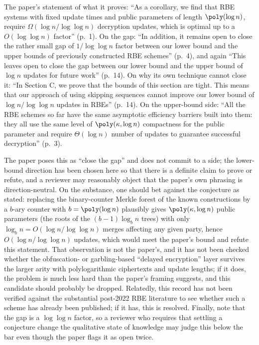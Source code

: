 \documentclass{conjura-conjecture}
\begin{document}
\begin{remark}[Openness]\label{rem:open}
The paper's statement of what it proves: ``As a corollary, we find that
RBE systems with fixed update times and public parameters of length
$\poly(\log n)$, require $\Omega(\log n/\log\log n)$ decryption
updates, which is optimal up to a $O(\log\log n)$ factor'' (p.~1). On
the gap: ``In addition, it remains open to close the rather small gap of
$1/\log\log n$ factor between our lower bound and the upper bounds of
previously constructed RBE schemes'' (p.~4), and again ``This leaves
open to close the gap between our lower bound and the upper bound of
$\log n$ updates for future work'' (p.~14). On why its own technique
cannot close it: ``In Section C, we prove that the bounds of this
section are tight. This means that our approach of using skipping
sequences cannot improve our lower bound of $\log n/\log\log n$ updates
in RBEs'' (p.~14). On the upper-bound side: ``All the RBE schemes so far
have the same asymptotic efficiency barriers built into them: they all
use the same level of $\poly(\kappa,\log n)$ compactness for the public
parameter and require $\Theta(\log n)$ number of updates to guarantee
successful decryption'' (p.~3).
\end{remark}

\begin{remark}\label{rem:caveats}
The paper poses this as ``close the gap'' and does not commit to a side;
the lower-bound direction has been chosen here so that there is a
definite claim to prove or refute, and a reviewer may reasonably object
that the paper's own phrasing is direction-neutral. On the substance,
one should bet against the conjecture as stated: replacing the
binary-counter Merkle forest of the known constructions by a $b$-ary
counter with $b = \poly(\log n)$ plausibly gives
$\poly(\kappa,\log n)$ public parameters (the roots of the
$(b-1)\log_b n$ trees) with only $\log_b n = O(\log n/\log\log n)$
merges affecting any given party, hence $O(\log n/\log\log n)$ updates,
which would meet the paper's bound and refute this statement. That
observation is not the paper's, and it has not been checked whether the
obfuscation- or garbling-based ``delayed encryption'' layer survives the
larger arity with polylogarithmic ciphertexts and update lengths; if it
does, the problem is much less hard than the paper's framing suggests,
and this candidate should probably be dropped. Relatedly, this record
has not been verified against the substantial post-2022 RBE literature
to see whether such a scheme has already been published; if it has, this
is resolved. Finally, note that the gap is a $\log\log n$ factor, so a
reviewer who requires that settling a conjecture change the qualitative
state of knowledge may judge this below the bar even though the paper
flags it as open twice.
\end{remark}
\end{document}
